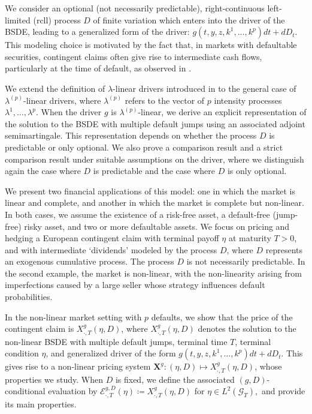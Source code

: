 \documentclass[11pt,a4paper]{article}
\numberwithin{equation}{section}
\theoremstyle{newPlain}
\theoremstyle{newDefinition}
\theoremstyle{newRemark}
\begin{document}
We consider an optional (not necessarily predictable), right-continuous left-limited (rcll) process $D$ of finite variation which enters into the driver of the BSDE, leading to a generalized form of the driver: $g(t, y, z, k^1, \ldots, k^p)dt + dD_t$. This modeling choice is motivated by the fact that, in markets with defaultable securities, contingent claims often give rise to intermediate cash flows, particularly at the time of default, as observed in \cite{bielecki2004hedging}.

We extend the definition of $\lambda$-linear drivers introduced in \cite{dumitrescu2018bsdes} to the general case of $\lambda^{(p)}$-linear drivers, where $\lambda^{(p)}$ refers to the vector of $p$ intensity processes $\lambda^1, \ldots, \lambda^p$. When the driver $g$ is $\lambda^{(p)}$-linear, we derive an explicit representation of the solution to the BSDE with multiple default jumps using an associated adjoint semimartingale. This representation depends on whether the process $D$ is predictable or only optional. We also prove a comparison result and a strict comparison result under suitable assumptions on the driver, where we distinguish again the case where  $D$ is predictable and the case where $D$ is  only optional.

We present two financial applications of this model: one in which the market is linear and complete, and another in which the market is complete but non-linear. In both cases, we assume the existence of a risk-free asset, a default-free (jump-free) risky asset, and two or more defaultable assets. We focus on pricing and hedging a European contingent claim with terminal payoff $\eta$ at maturity $T > 0$, and with intermediate `dividends' modeled by the process $D$, where $D$ represents an exogenous cumulative process. The process $D$ is not necessarily predictable.  In the second example, the market is non-linear, with the non-linearity arising from imperfections caused by a large seller whose strategy influences default probabilities.

In the non-linear market setting with $p$ defaults, we show that the price of the contingent claim is $X_{\cdot, T}^g(\eta,D)$, where $X_{\cdot, T}^g(\eta,D)$ denotes the solution to the non-linear BSDE with multiple default jumps, terminal time $T$, terminal condition $\eta$, and   generalized driver of the form $g(t,y,z,k^1,\ldots,k^p)dt + dD_t$. This gives rise to a non-linear pricing system $\mathbf{X}^g:(\eta,D)\mapsto X_{\cdot,T}^g(\eta,D)$, whose properties we study. When $D$ is fixed, we define the associated $(g,D)$-conditional evaluation by $\mathscr{E}_{\cdot,T}^{g,D}(\eta)\coloneqq X_{\cdot,T}^g(\eta,D)$ for  $\eta\in L^2(\mathcal{G}_T),$ and provide its main properties. %
\end{document}
